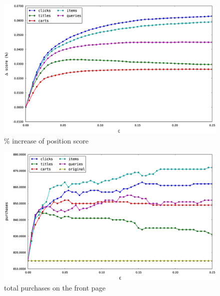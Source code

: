 \documentclass{article}
\begin{document}
\begin{figure}[htbp!]
\centering
\includegraphics[width=\textwidth]{000050_0.48chunk.k100.i2.n100.percent_increase_position_score.0-0.25.eps}
\caption{\% increase of position score}
    \label{fig:percent_increase_of_position_score}
\end{figure}

\begin{figure}[htbp!]
\centering
\includegraphics[width=\textwidth]{000050_0.48chunk.k100.i2.n100.total_purchased_front_page.0-0.25.eps}
\caption{total purchases on the front page}
\label{fig:total_purchases_on_the_front_page}
\end{figure}
\end{document}
